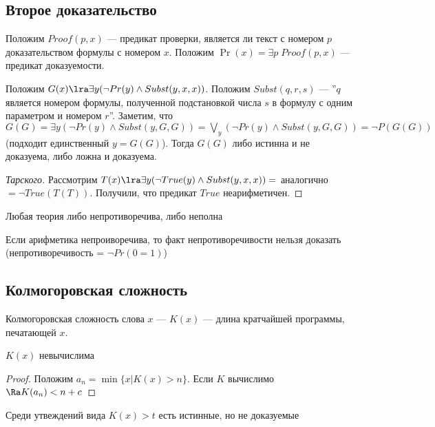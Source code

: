 \subsection{Второе доказательство}
Положим \(Proof(p, x)\) --- предикат проверки, является ли текст с номером \(p\) доказательством формулы с номером \(x\).  Положим \(\Pr(x) = \exists p\;Proof(p, x)\) --- предикат доказуемости.

Положим \(G(x) \lra \exists y (\neg Pr(y) \wedge Subst(y, x, x))\). Положим \(Subst(q, r, s)\) --- ''\(q\) является номером формулы, полученной подстановкой числа \(s\) в формулу с одним параметром и номером \(r\)''. Заметим, что \(G(G) = \exists y (\neg Pr(y) \wedge Subst(y, G, G))= \bigvee_y(\neg Pr(y) \wedge Subst(y, G, G)) = \neg P(G(G))\) (подходит единственный \(y = G(G)\)). Тогда \(G(G)\) либо истинна и не доказуема, либо ложна и доказуема.

\begin{proof}[Тарского]
    Рассмотрим \(T(x) \lra \exists y (\neg True(y) \wedge Subst(y, x, x)) =\) аналогично \(= \neg True(T(T))\). Получили, что предикат \(True\) неарифметичен.
\end{proof}

\begin{theorem}
    Любая теория либо непротиворечива, либо неполна
\end{theorem}

\begin{theorem}
    Если арифметика непроиворечива, то факт непротиворечивости нельзя доказать (непротиворечивость = \(\neg Pr(0 = 1)\))
\end{theorem}

\subsection{Колмогоровская сложность}
\begin{definition}
    Колмогоровская сложность слова \(x\) --- \(K(x)\) --- длина кратчайшей программы, печатающей \(x\). 
\end{definition}

\begin{proposition}
    \(K(x)\) невычислима
\end{proposition}
\begin{proof}
    Положим \(a_n = \min\{x | K(x) > n\}\). Если \(K\) вычислимо \(\Ra K(a_n) < n + c\)
\end{proof}

\begin{note}
    Среди утвеждений вида \(K(x) > t\) есть истинные, но не доказуемые
\end{note}
